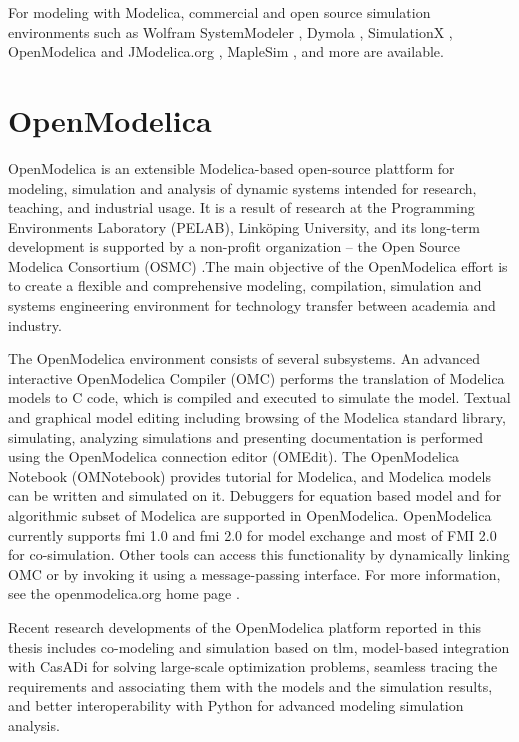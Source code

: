 For modeling with Modelica, commercial and open source simulation environments such as Wolfram SystemModeler \cite{wolfram, wolframmats, wolframpeter}, Dymola \cite{dymola, dymoladag}, SimulationX \cite{simulationx}, OpenModelica \cite{openmodelica,openmodelicapeter} and JModelica.org \cite{jmodelica}, MapleSim \cite{maplesim}, and more are available. 


\section{OpenModelica}
\label{sec:openmodelica}

OpenModelica \cite{openmodelica,openmodelicapeter} is an extensible Modelica-based open-source plattform for modeling, simulation and analysis of dynamic systems intended for research, teaching, and industrial usage. It is a result of research at the Programming Environments Laboratory (PELAB), Link\"{o}ping University, and its long-term development is supported by a non-profit organization – the Open Source Modelica Consortium (OSMC) \cite{osmc}.The main objective of the OpenModelica effort is to create a flexible and comprehensive modeling, compilation, simulation and systems engineering environment for technology transfer between academia and industry.

The OpenModelica environment consists of several subsystems. An advanced interactive OpenModelica Compiler (OMC) performs the translation of Modelica models to C code, which is compiled and executed to simulate the model.  Textual and graphical model editing including browsing of the Modelica standard library, simulating, analyzing simulations and presenting documentation is performed using the OpenModelica connection editor (OMEdit). The OpenModelica Notebook (OMNotebook) provides tutorial for Modelica, and Modelica models can be written and simulated on it. Debuggers for equation based model and for algorithmic subset of Modelica are supported in OpenModelica.  OpenModelica currently supports \acrshort{fmi} 1.0 and \acrshort{fmi} 2.0 for model exchange and most of FMI 2.0 for co-simulation. Other tools can access this functionality by dynamically linking OMC or by invoking it using a message-passing interface. For more information, see the openmodelica.org home page \cite{openmodelica}.

Recent research developments of the OpenModelica platform reported in this thesis includes co-modeling and simulation based on \acrshort{tlm}, model-based integration with CasADi \cite{casadi} for solving large-scale optimization problems, seamless tracing the requirements and associating them with the models and the simulation results,  and better  interoperability with Python for advanced modeling simulation analysis.


